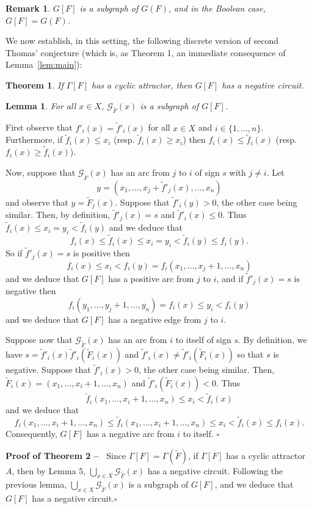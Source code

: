 \documentclass[11pt]{article}
\newtheorem{lemma}{Lemma}
\newtheorem{theorem}{Theorem}
\newtheorem{remark}{Remark}
\def\proof{\noindent{\bf Proof --~}}
\def\cqfd{\hfill$\square$}
\def\G{\mathscr{G}}
\def\1n{1,\dots,n}
\def\F{{\tilde F}}
\def\f{\tilde f}
\begin{document}
\begin{remark}
{\emph{$G[F]$ is a subgraph of $G(F)$, and in the Boolean case,
$G[F]=G(F)$.}}
\end{remark}


We now establish, in this setting, the following discrete version of
second Thomas' conjecture (which is, as Theorem 1, an immediate
consequence of Lemma~{\ref{lem:main}}):

\begin{theorem}
If $\Gamma[F]$ has a cyclic attractor, then $G[F]$ has a negative
circuit.
\end{theorem}


\begin{lemma}
For all $x\in X$, $\G_{\F}(x)$ is a subgraph of $G[F]$.
\end{lemma}


\proof
First observe that $f'_i(x)=\f'_i(x)$ for all $x\in X$ and
$i\in\{\1n\}$. Furthermore, if $\f_i(x)\leq x_i$ (resp. $\f_i(x)\geq
x_i$) then $f_i(x)\leq\f_i(x)$ (resp. $f_i(x)\geq
\f_i(x)$).

Now, suppose that $\G_\F(x)$ has an arc from $j$ to $i$ of sign $s$
with $j\neq i$. Let
\[
y=(x_1,\dots,x_j+\f'_j(x),\dots,x_n)
\]
and observe that $y=\F_j(x)$. Suppose that $\f'_i(y)>0$, the other
case being similar. Then, by definition, $\f'_j(x)=s$ and
$\f'_i(x)\leq 0$. Thus $\f_i(x)\leq x_i=y_i < \f_i(y)$ and we deduce
that
\[
f_i(x)\leq \f_i(x)\leq x_i=y_i < \f_i(y)\leq f_i(y).
\]
So if $\f'_j(x)=s$ is positive then
\[
f_i(x)\leq x_i<f_i(y)=f_i(x_1,\dots,x_j+1,\dots,x_n)
\]
and we deduce that $G[F]$ has a positive arc from $j$ to $i$, and if
$\f'_j(x)=s$ is negative then
\[
f_i(y_1,\dots,y_j+1,\dots,y_n)=f_i(x)\leq y_i<f_i(y)
\]
and we deduce that $G[F]$ has a negative edge from $j$ to $i$. 

Suppose now that $\G_\F(x)$ has an arc from $i$ to itself of sign
$s$. By definition, we have $s=\f'_i(x)\f'_i(\F_i(x))$ and
$\f'_i(x)\neq\f'_i(\F_i(x))$ so that $s$ is negative. Suppose that
$\f'_i(x)>0$, the other case being similar. Then,
$\F_i(x)=(x_1,\dots,x_i+1,\dots,x_n)$ and $\f'_i(\F_i(x))<0$. Thus
\[
\f_i(x_1,\dots,x_i+1,\dots,x_n)\leq x_i<\f_i(x)
\]
and we deduce that
\[
f_i(x_1,\dots,x_i+1,\dots,x_n)\leq 
\f_i(x_1,\dots,x_i+1,\dots,x_n)\leq x_i<\f_i(x)\leq f_i(x).
\] 
Consequently, $G[F]$ has a negative arc from $i$ to itself.
\cqfd\bigskip


\noindent
{\bf Proof of Theorem 2 --~} Since $\Gamma[F]=\Gamma(\F)$, if
$\Gamma[F]$ has a cyclic attractor $A$, then by Lemma 5,
$\bigcup_{x\in X}\G_\F(x)$ has a negative circuit. Following the
previous lemma, $\bigcup_{x\in X}\G_\F(x)$ is a subgraph of $G[F]$,
and we deduce that $G[F]$ has a negative circuit.\cqfd
\end{document}
